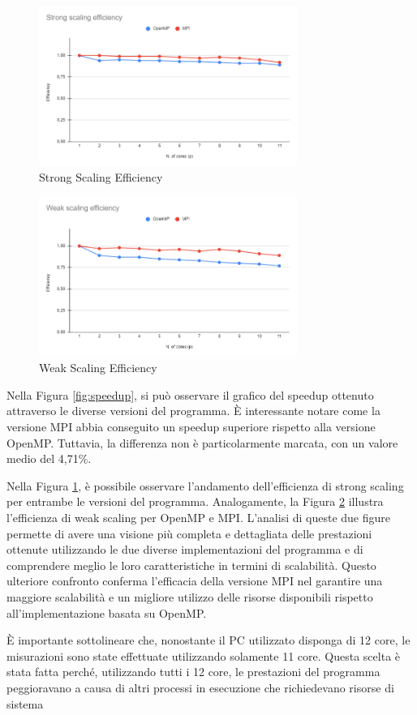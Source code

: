 \documentclass[a4paper,12pt, oneside]{article}
\begin{document}
\begin{figure}[h]
    \centering
    \includegraphics[width=0.75\textwidth]{strong-scaling.png}
    \caption{Strong Scaling Efficiency}
    \label{fig:strong-scaling}
\end{figure}

\begin{figure}[h]
    \centering
    \includegraphics[width=0.75\textwidth]{weak-scaling.png}
    \caption{Weak Scaling Efficiency}
    \label{fig:weak-scaling}
\end{figure}

Nella Figura \ref{fig:speedup}, si può osservare il grafico del speedup ottenuto attraverso
le diverse versioni del programma. È interessante notare come la versione MPI abbia
conseguito un speedup superiore rispetto alla versione OpenMP. Tuttavia, la differenza non
è particolarmente marcata, con un valore medio del 4,71\%.

Nella Figura \ref{fig:strong-scaling}, è possibile osservare l'andamento dell'efficienza di
strong scaling per entrambe le versioni del programma. Analogamente, la Figura \ref{fig:weak-scaling}
illustra l'efficienza di weak scaling per OpenMP e MPI. L'analisi di queste due figure
permette di avere una visione più completa e dettagliata delle prestazioni ottenute
utilizzando le due diverse implementazioni del programma e di comprendere meglio le loro
caratteristiche in termini di scalabilità. Questo ulteriore confronto conferma l'efficacia
della versione MPI nel garantire una maggiore scalabilità e un migliore utilizzo delle
risorse disponibili rispetto all'implementazione basata su OpenMP.

È importante sottolineare che, nonostante il PC utilizzato disponga di 12 core, le
misurazioni sono state effettuate utilizzando solamente 11 core. Questa scelta è stata
fatta perché, utilizzando tutti i 12 core, le prestazioni del programma peggioravano a
causa di altri processi in esecuzione che richiedevano risorse di sistema
\end{document}
